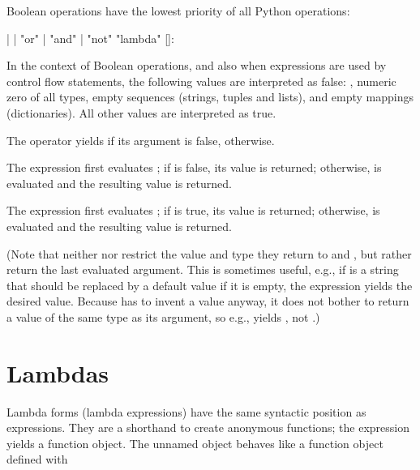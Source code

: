 Boolean operations have the lowest priority of all Python operations:

\begin{productionlist}
             { | }
             { |  "or" }
             { |  "and" }
             { | "not" }
             {"lambda" []: }
\end{productionlist}

In the context of Boolean operations, and also when expressions are
used by control flow statements, the following values are interpreted
as false: , numeric zero of all types, empty sequences
(strings, tuples and lists), and empty mappings (dictionaries).  All
other values are interpreted as true.

The operator  yields  if its argument is false,
 otherwise.

The expression  first evaluates ; if
 is false, its value is returned; otherwise,  is
evaluated and the resulting value is returned.

The expression  first evaluates ; if
 is true, its value is returned; otherwise,  is
evaluated and the resulting value is returned.

(Note that neither  nor  restrict the value
and type they return to  and , but rather return the
last evaluated argument.
This is sometimes useful, e.g., if  is a string that should be
replaced by a default value if it is empty, the expression
 yields the desired value.  Because  has to
invent a value anyway, it does not bother to return a value of the
same type as its argument, so e.g.,  yields ,
not .)

\section{Lambdas\label{lambdas}}

Lambda forms (lambda expressions) have the same syntactic position as
expressions.  They are a shorthand to create anonymous functions; the
expression 
yields a function object.  The unnamed object behaves like a function
object defined with

